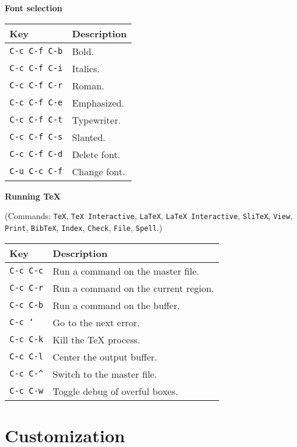 \documentclass{article}
\begin{document}
\smallskip

\noindent
\textbf{Font selection}

\smallskip

\noindent
\begin{tabular}{p{\firstcol}p{\secondcol}}
\hline
\textbf{Key} & \textbf{Description}\\
\hline
\texttt{C-c C-f C-b}
& Bold.\\
\texttt{C-c C-f C-i}
& Italics.\\
\texttt{C-c C-f C-r}
& Roman.\\
\texttt{C-c C-f C-e}
& Emphasized.\\
\texttt{C-c C-f C-t}
& Typewriter.\\
\texttt{C-c C-f C-s}
& Slanted.\\
\texttt{C-c C-f C-d}
& Delete font.\\
\texttt{C-u C-c C-f}
& Change font.
\end{tabular}

\noindent
\textbf{Running \TeX{}}

\smallskip

\noindent
(Commands: \texttt{TeX}, \texttt{TeX Interactive}, \texttt{LaTeX},
\texttt{LaTeX Interactive}, \texttt{SliTeX}, \texttt{View},
\texttt{Print}, \texttt{BibTeX}, \texttt{Index}, \texttt{Check},
\texttt{File}, \texttt{Spell}.)

\smallskip

\noindent
\begin{tabular}{p{\firstcol}p{\secondcol}}
\hline
\textbf{Key} & \textbf{Description}\\
\hline
\texttt{C-c C-c}
& Run a command on the master file.\\
\texttt{C-c C-r}
& Run a command on the current region.\\
\texttt{C-c C-b}
& Run a command on the buffer.\\
\texttt{C-c `}
& Go to the next error.\\
\texttt{C-c C-k}
& Kill the \TeX{} process.\\
\texttt{C-c C-l}
& Center the output buffer.\\
\texttt{C-c C-\^{}}
& Switch to the master file.\\
\texttt{C-c C-w}
& Toggle debug of overful boxes.\\
\end{tabular}

\newpage

\section{Customization}
\end{document}
